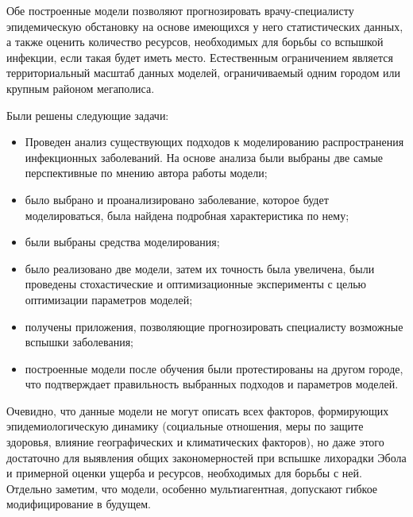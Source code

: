 Обе построенные модели позволяют прогнозировать врачу-специалисту эпидемическую обстановку на основе имеющихся у него статистических данных, а также оценить количество ресурсов, необходимых для борьбы со вспышкой инфекции, если такая будет иметь место. Естественным ограничением является территориальный масштаб данных моделей, ограничиваемый одним городом или крупным районом мегаполиса.

Были решены следующие задачи:
\begin{itemize}
	\item Проведен анализ существующих подходов к моделированию распространения инфекционных заболеваний. На основе анализа были выбраны две самые перспективные по мнению автора работы модели;
	\item было выбрано и проанализировано заболевание, которое будет моделироваться, была найдена подробная характеристика по нему;
	\item были выбраны средства моделирования;
	\item было реализовано две модели, затем их точность была увеличена, были проведены стохастические и оптимизационные эксперименты с целью оптимизации параметров моделей;
	\item получены приложения, позволяющие прогнозировать специалисту возможные вспышки заболевания;
	\item построенные модели после обучения были протестированы на другом городе, что подтверждает правильность выбранных подходов и параметров моделей.
\end{itemize}

Очевидно, что данные модели не могут описать всех факторов, формирующих эпидемиологическую динамику (социальные отношения, меры по защите здоровья, влияние географических и климатических факторов), но даже этого достаточно для выявления общих закономерностей при вспышке лихорадки Эбола и примерной оценки ущерба и ресурсов, необходимых для борьбы с ней. Отдельно заметим, что модели, особенно мультиагентная, допускают гибкое модифицирование в будущем. 